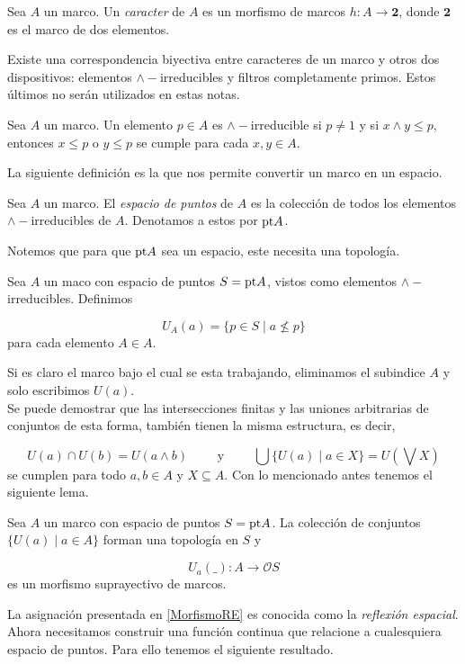 \documentclass{comunicaciones}
\begin{document}
\begin{dfn}
    Sea $A$ un marco. Un \emph{caracter} de $A$ es un morfismo de marcos $h\colon A\to \mathbf{2}$, donde $\mathbf{2}$ es el marco de dos elementos.
\end{dfn}

Existe una correspondencia biyectiva entre caracteres de un marco y otros dos dispositivos: elementos $\wedge-$irreducibles y filtros completamente primos. Estos últimos no serán utilizados en estas notas.

\begin{dfn}\label{infirre}
    Sea $A$ un marco. Un elemento $p\in A$ es $\wedge-$irreducible si $p\neq 1$ y si $x\wedge y\leq p$, entonces $x\leq p$ o $y\leq p$ se cumple para cada $x, y \in A$.
\end{dfn}

La siguiente definición es la que nos permite convertir un marco en un espacio.

\begin{dfn}
    Sea $A$ un marco. El \emph{espacio de puntos} de $A$ es la colección de todos los elementos $\wedge-$irreducibles de $A$. Denotamos a estos por $\mathrm{pt} A$.
\end{dfn}

Notemos que para que $\mathrm{pt} A$ sea un espacio, este necesita una topología.

\begin{dfn}
    Sea $A$ un maco con espacio de puntos $S=\mathrm{pt} A$, vistos como elementos $\wedge-$irreducibles. Definimos 

    \[
    U_A(a)=\{p\in S\mid a\nleq p\}
    \]
    para cada elemento $A\in A$. 
\end{dfn}

Si es claro el marco bajo el cual se esta trabajando, eliminamos el subindice $A$ y solo escribimos $U(a)$.\\

Se puede demostrar que las intersecciones finitas y las uniones arbitrarias de conjuntos de esta forma, también tienen la misma estructura, es decir,

\[
U(a)\cap U(b)=U(a\wedge b)\qquad\mbox{ y }\qquad\bigcup\{U(a)\mid a\in X\}=U\left(\bigvee X\right)
\]
se cumplen para todo $a, b\in A$ y $X\subseteq A$. Con lo mencionado antes tenemos el siguiente lema.

\begin{lem}\label{ReflexionEspacial}
    Sea $A$ un marco con espacio de puntos $S=\mathrm{pt} A$. La colección de conjuntos $\{U(a)\mid a\in A\}$ forman una topología en $S$ y 

    \begin{equation}\label{MorfismoRE}
            U_a(\_)\colon A\to \mathcal{O}S
    \end{equation}
    es un morfismo suprayectivo de marcos.
\end{lem}
La asignación presentada en \ref{MorfismoRE} es conocida como la \emph{reflexión espacial}. Ahora necesitamos construir una función continua que relacione a cualesquiera espacio de puntos. Para ello tenemos el siguiente resultado.
\end{document}
